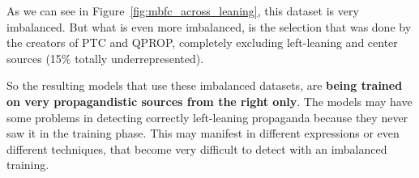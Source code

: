 As we can see in Figure~\ref{fig:mbfc_across_leaning}, this dataset is very imbalanced. But what is even more imbalanced, is the selection that was done by the creators of PTC and QPROP, completely excluding left-leaning and center sources (15\% totally underrepresented).

So the resulting models that use these imbalanced datasets, are \textbf{being trained on very propagandistic sources from the right only}. The models may have some problems in detecting correctly left-leaning propaganda because they never saw it in the training phase. This may manifest in different expressions or even different techniques, that become very difficult to detect with an imbalanced training.







